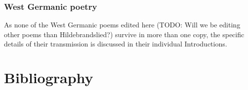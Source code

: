     \subsubsection{West Germanic poetry}

    As none of the West Germanic poems edited here (TODO: Will we be editing other poems than Hildebrandslied?) survive in more than one copy, the specific details of their transmission is discussed in their individual Introductions.

\section{Bibliography}
  \printbibliography%
